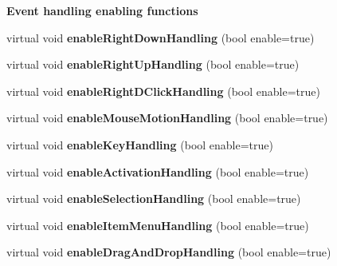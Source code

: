 \begin{Indent}{\bf Event handling enabling functions}
\begin{DoxyCompactItemize}
\item 
virtual void {\bfseries enable\+Right\+Down\+Handling} (bool enable=true)\hypertarget{class_view_1_1_robot_world_canvas_a8b249411be7ea966eb7ad01698d30ff4}{}\label{class_view_1_1_robot_world_canvas_a8b249411be7ea966eb7ad01698d30ff4}

\item 
virtual void {\bfseries enable\+Right\+Up\+Handling} (bool enable=true)\hypertarget{class_view_1_1_robot_world_canvas_ade500a4e9585a02b05f3c2bdcca59b39}{}\label{class_view_1_1_robot_world_canvas_ade500a4e9585a02b05f3c2bdcca59b39}

\item 
virtual void {\bfseries enable\+Right\+D\+Click\+Handling} (bool enable=true)\hypertarget{class_view_1_1_robot_world_canvas_addbc170d9d9c998af49ffca65ed6216a}{}\label{class_view_1_1_robot_world_canvas_addbc170d9d9c998af49ffca65ed6216a}

\item 
virtual void {\bfseries enable\+Mouse\+Motion\+Handling} (bool enable=true)\hypertarget{class_view_1_1_robot_world_canvas_a6decd9bcd3acac80852476fc30f5df8e}{}\label{class_view_1_1_robot_world_canvas_a6decd9bcd3acac80852476fc30f5df8e}

\item 
virtual void {\bfseries enable\+Key\+Handling} (bool enable=true)\hypertarget{class_view_1_1_robot_world_canvas_a531ca3c86af833a551ad9f3606cd4c9f}{}\label{class_view_1_1_robot_world_canvas_a531ca3c86af833a551ad9f3606cd4c9f}

\item 
virtual void {\bfseries enable\+Activation\+Handling} (bool enable=true)\hypertarget{class_view_1_1_robot_world_canvas_a652f1eec754019d4d8e3c32a7749545f}{}\label{class_view_1_1_robot_world_canvas_a652f1eec754019d4d8e3c32a7749545f}

\item 
virtual void {\bfseries enable\+Selection\+Handling} (bool enable=true)\hypertarget{class_view_1_1_robot_world_canvas_a6e0de11c21b2b482c440cc3b1dfc70ca}{}\label{class_view_1_1_robot_world_canvas_a6e0de11c21b2b482c440cc3b1dfc70ca}

\item 
virtual void {\bfseries enable\+Item\+Menu\+Handling} (bool enable=true)\hypertarget{class_view_1_1_robot_world_canvas_ad030befe82d71f44547da7c180427367}{}\label{class_view_1_1_robot_world_canvas_ad030befe82d71f44547da7c180427367}

\item 
virtual void {\bfseries enable\+Drag\+And\+Drop\+Handling} (bool enable=true)\hypertarget{class_view_1_1_robot_world_canvas_a923d937443987722653140d1f22e16b9}{}\label{class_view_1_1_robot_world_canvas_a923d937443987722653140d1f22e16b9}

\end{DoxyCompactItemize}
\end{Indent}
